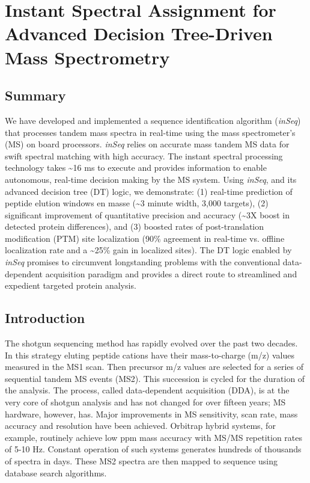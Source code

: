 \chapter{Instant Spectral Assignment for Advanced Decision Tree-Driven Mass Spectrometry}

\def\inseq{\textit{inSeq}}

\section{Summary}
We have developed and implemented a sequence identification algorithm (\inseq{}) that processes tandem mass spectra in real-time using the mass spectrometer's (MS) on board processors. \inseq{} relies on accurate mass tandem MS data for swift spectral matching with high accuracy. The instant spectral processing technology takes \textasciitilde16 ms to execute and provides information to enable autonomous, real-time decision making by the MS system. Using \inseq{}, and its advanced decision tree (DT) logic, we demonstrate: (1) real-time prediction of peptide elution windows en masse (\textasciitilde3 minute width, 3,000 targets), (2) significant improvement of quantitative precision and accuracy (\textasciitilde3X boost in detected protein differences), and (3) boosted rates of post-translation modification (PTM) site localization (90\% agreement in real-time vs. offline localization rate and a \textasciitilde25\% gain in localized sites). The DT logic enabled by \inseq{} promises to circumvent longstanding problems with the conventional data-dependent acquisition paradigm and provides a direct route to streamlined and expedient targeted protein analysis.

\section{Introduction}
The shotgun sequencing method has rapidly evolved over the past two decades.\cite{mudpit, bigtime} In this strategy eluting peptide cations have their mass-to-charge (m/z) values measured in the MS1 scan. Then precursor m/z values are selected for a series of sequential tandem MS events (MS2). This succession is cycled for the duration of the analysis. The process, called data-dependent acquisition (DDA), is at the very core of shotgun analysis and has not changed for over fifteen years; MS hardware, however, has. Major improvements in MS sensitivity, scan rate, mass accuracy and resolution have been achieved. Orbitrap hybrid systems, for example, routinely achieve low ppm mass accuracy with MS/MS repetition rates of 5-10 Hz.\cite{subppm,qexactive} Constant operation of such systems generates hundreds of thousands of spectra in days. These MS2 spectra are then mapped to sequence using database search algorithms.\cite{sequest,mascot,omssa}

